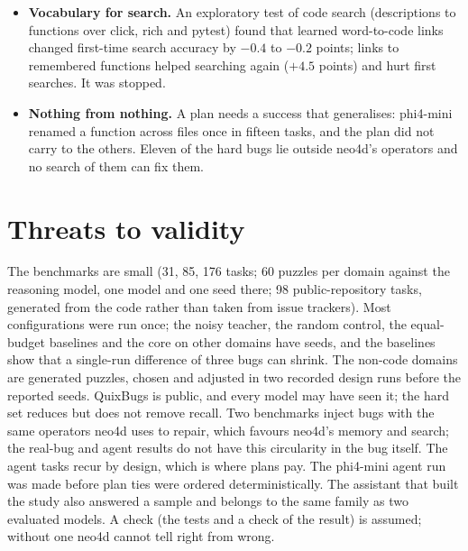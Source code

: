 \documentclass[10pt]{article}
\begin{document}
\begin{itemize}
  a second.
  \item \textbf{Vocabulary for search.} An exploratory test of code search (descriptions to functions over click,
  rich and pytest) found that learned word-to-code links changed first-time search accuracy by $-0.4$ to $-0.2$
  points; links to remembered functions helped searching again ($+4.5$ points) and hurt first searches. It was stopped.
  \item \textbf{Nothing from nothing.} A plan needs a success that generalises: phi4-mini renamed a function across
  files once in fifteen tasks, and the plan did not carry to the others. Eleven of the hard bugs lie outside neo4d's operators and no search of them can fix them.
\end{itemize}

\section{Threats to validity}
The benchmarks are small (31, 85, 176 tasks; 60 puzzles per domain against the reasoning model, one model and one
seed there; 98 public-repository tasks, generated from the code rather than taken from issue trackers). Most configurations were run once; the noisy teacher, the random
control, the equal-budget baselines and the core on other domains have seeds, and the baselines show that a single-run
difference of three bugs can shrink. The non-code domains are generated puzzles, chosen and adjusted in two recorded
design runs before the reported seeds. QuixBugs is public, and every model may have seen it; the hard set reduces but does not remove recall. Two
benchmarks inject bugs with the same operators neo4d uses to repair, which favours neo4d's memory and search; the
real-bug and agent results do not have this circularity in the bug itself. The agent tasks recur by design, which is
where plans pay. The phi4-mini agent run was made before plan ties were ordered deterministically. The assistant that
built the study also answered a sample and belongs to the same family as two evaluated models. A check (the tests and
a check of the result) is assumed; without one neo4d cannot tell right from wrong.
\end{document}
